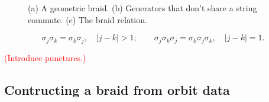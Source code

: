 \documentclass[12pt]{article}
\newcommand{\jlt}[1]{\textcolor{red}{(#1)}}
\begin{document}
%
\begin{figure}
  \begin{center}
    \hspace{.025\textwidth}
    \hspace{.025\textwidth}
  \end{center}
  \caption{(a) A geometric braid.  (b) Generators that don't share a string
    commute.  (c) The braid relation.}
\end{figure}
%

\begin{equation}
  \sigma_j\sigma_k=\sigma_k\sigma_j, \quad \lvert j-k\rvert > 1; \qquad
  \sigma_j\sigma_k\sigma_j = \sigma_k\sigma_j\sigma_k, \quad \lvert j-k\rvert=1.
  \label{eq:relations}
\end{equation}


\jlt{Introduce punctures.}

\subsection{Contructing a braid from orbit data}
\label{sec:braidfromdata}
\end{document}
